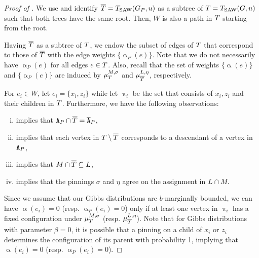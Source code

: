 \documentclass[11pt,reqno]{amsart}
\numberwithin{equation}{section}
\newcommand{\applegreen}[1]{ {\color{applegreen}#1}}
\newcommand{\blue}[1]{{\color{blue}#1}}
\newcommand{\capri}[1]{{\color{capri}#1}}
\newcommand{\cadmiumgreen}[1]{{\color{cadmiumgreen}#1}}
\newcommand{\cadmiumorange}[1]{{\color{cadmiumorange}#1}}
\newcommand{\goldenbrown}[1]{{\color{goldenbrown}#1}}
\newcommand{\heliotrope}[1]{{\color{heliotrope}#1}}
\newcommand{\red}[1]{{\color{red}#1}}
\newcommand{\Tsaw}{T_{\rm SAW}}
\renewcommand{\applegreen}[1]{#1}
\renewcommand{\blue}[1]{#1}
\renewcommand{\capri}[1]{#1}
\renewcommand{\cadmiumgreen}[1]{#1}
\renewcommand{\cadmiumorange}[1]{#1}
\renewcommand{\goldenbrown}[1]{#1}
\renewcommand{\heliotrope}[1]{#1}
\renewcommand{\red}[1]{#1}
\newcommand{\ke}{\blue{e}}
\newcommand{\ki}{\capri{i}}
\newcommand{\kL}{\cadmiumorange{L}}
\newcommand{\kell}{{\color{green(pigment)}\ell}}%
\newcommand{\kP}{\goldenbrown{P}}
\newcommand{\ku}{\red{u}}
\newcommand{\kW}{\blue{W}}
\newcommand{\kx}{\heliotrope{x}}
\newcommand{\kz}{\cadmiumgreen{z}}
\renewcommand{\ke}{e}
\renewcommand{\ki}{i}
\renewcommand{\kL}{L}
\renewcommand{\kell}{\ell}
\renewcommand{\kP}{P}
\renewcommand{\ku}{u}
\renewcommand{\kW}{W}
\renewcommand{\kx}{x}
\renewcommand{\kz}{z}
\newcommand{\infweight}{\upalpha}
\begin{document}
\begin{proof}[Proof of ]
 

We use  and identify $\SMTPu=\Tsaw(\gext{G}{\kP},\ku)$ as a subtree of $\SMTu=\Tsaw(G,\ku)$
such that both trees have  the same root. Then, $\kW$ is also a path in $\SMTu$ starting from the root. 


Having $\SMTPu$ as a subtree of $\SMTu$, we endow the subset of edges of  $\SMTu$ that correspond to those of $\SMTPu$
with the edge weights $\{\infweight_{\kP}(\ke)\}$. Note that  we do not necessarily  have $\infweight_{\kP}(\ke)$ for all edges $\ke\in \SMTu$.
Also,  recall that the set of weights $\{\infweight(\ke)\}$  and $\{\infweight_{\kP}(\ke)\}$ are induced by 
$\mu^{M,\sigma}_{\SMTu}$ and  $\mu^{\kL,\eta}_{\SMTPu}$, respectively. 

For $\ke_{\ki}\in \kW$, let  $\ke_{\ki}=\{\kx_{\ki},\kz_{\ki}\}$ %
while let $\uppi_{\ki}$ be the set  that consists of $\kx_{\ki}, \kz_{\ki}$ and their 
children in $\SMTu$.
%
Furthermore, we have the following observations:
 \begin{enumerate}[(i)]
\item {} implies that $\cpT\cap \SMTPu=\cpTP$, \label{obs:APBarTVsBarAp}
\item {} implies that each vertex in $\SMTu \setminus \SMTPu$ corresponds to a descendant of a vertex in $\cpT$, \label{obs:TminusBarTVsAp}
\item {} implies that $M \cap \SMTPu \subseteq \kL$, \label{obs:PinMVsBarTVsPinL}
\item {} implies that the pinnings $\sigma$ and $\eta$ agree on the assignment  in $\kL\cap M$. \label{obs:PinMVsPinLIntesection}
\end{enumerate}
Since we assume that our Gibbs distributions are $b$-marginally bounded,  we can have $\infweight(\ke_{\ki})=0$ (resp. $\infweight_{\kP}(\ke_{\ki})=0$) only if at least one vertex in
$\uppi_{\ki}$ has a fixed configuration under $\mu^{M,\sigma}_{\SMTu}$ (resp. $\mu^{L,\eta}_{\SMTPu}$).
Note that for Gibbs  distributions with parameter $\beta=0$, it is possible that  a pinning on a child of $\kx_{\ki}$ or   $\kz_{\ki}$ 
determines  the configuration of its parent with probability 1, implying that  $\infweight(\ke_{\ki})=0$ (resp. $\infweight_{\kP}(\ke_{\ki})=0$). 



\end{proof}
\end{document}
